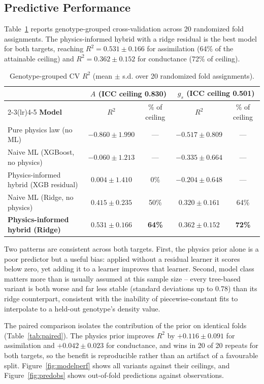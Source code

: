 \documentclass[runningheads]{llncs}
\begin{document}
\subsection{Predictive Performance}\label{sec:perf}

Table~\ref{tab:perf} reports genotype-grouped cross-validation across 20 randomized fold assignments. The physics-informed hybrid with a ridge residual is the best model for both targets, reaching $R^{2}=0.531\pm0.166$ for assimilation (64\% of the attainable ceiling) and $R^{2}=0.362\pm0.152$ for conductance (72\% of ceiling).

\begin{table}[t]
\caption{Genotype-grouped CV $R^{2}$ (mean $\pm$ s.d. over 20 randomized fold assignments).}\label{tab:perf}
\centering
\small
\begin{tabular}{lcccc}
\toprule
& \multicolumn{2}{c}{\textbf{$A$ (ICC ceiling 0.830)}} & \multicolumn{2}{c}{\textbf{$g_s$ (ICC ceiling 0.501)}} \\
\cmidrule(lr){2-3}\cmidrule(lr){4-5}
\textbf{Model} & $R^{2}$ & \% of ceiling & $R^{2}$ & \% of ceiling \\
\midrule
Pure physics law (no ML) & $-0.860\pm1.990$ & --- & $-0.517\pm0.809$ & --- \\
Naive ML (XGBoost, no physics) & $-0.060\pm1.213$ & --- & $-0.335\pm0.664$ & --- \\
Physics-informed hybrid (XGB residual) & $0.004\pm1.410$ & 0\% & $-0.204\pm0.648$ & --- \\
Naive ML (Ridge, no physics) & $0.415\pm0.235$ & 50\% & $0.320\pm0.161$ & 64\% \\
\textbf{Physics-informed hybrid (Ridge)} & $\mathbf{0.531\pm0.166}$ & \textbf{64\%} & $\mathbf{0.362\pm0.152}$ & \textbf{72\%} \\
\bottomrule
\end{tabular}
\end{table}

Two patterns are consistent across both targets. First, the physics prior alone is a poor predictor but a useful bias: applied without a residual learner it scores below zero, yet adding it to a learner improves that learner. Second, model class matters more than is usually assumed at this sample size -- every tree-based variant is both worse and far less stable (standard deviations up to 0.78) than its ridge counterpart, consistent with the inability of piecewise-constant fits to interpolate to a held-out genotype's density value.

The paired comparison isolates the contribution of the prior on identical folds (Table~\ref{tab:paired}). The physics prior improves $R^{2}$ by $+0.116\pm0.091$ for assimilation and $+0.042\pm0.023$ for conductance, and wins in 20 of 20 repeats for both targets, so the benefit is reproducible rather than an artifact of a favourable split. Figure~\ref{fig:modelperf} shows all variants against their ceilings, and Figure~\ref{fig:predobs} shows out-of-fold predictions against observations.
\end{document}

